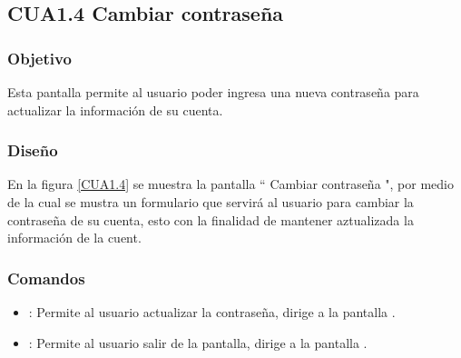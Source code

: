 \subsection{CUA1.4 Cambiar contraseña}

\subsubsection{Objetivo}

	
Esta pantalla permite al usuario poder ingresa una nueva contraseña para actualizar la información de su cuenta.

\subsubsection{Diseño}


    En la figura \ref{CUA1.4} se muestra la pantalla `` Cambiar contraseña ", por medio de la cual se mustra un formulario que servirá al usuario para cambiar la contraseña de su cuenta, esto con la finalidad de mantener aztualizada la información de la cuent.\\


\subsubsection{Comandos}
    \begin{itemize}
        \item {}: Permite al usuario actualizar la contraseña, dirige a la pantalla .
    	\item \btnRegresar[Regresar]: Permite al usuario salir de la pantalla, dirige a la pantalla .
    \end{itemize}

